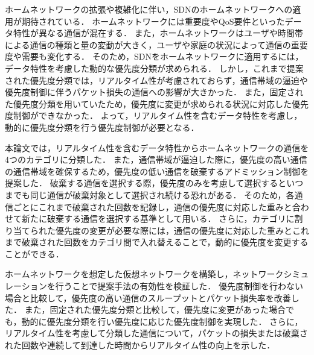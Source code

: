\documentclass[a4paper,11pt,uplatex]{ujreport}
\begin{document}
  ホームネットワークの拡張や複雑化に伴い，SDNのホームネットワークへの適用が期待されている．
  ホームネットワークには重要度やQoS要件といったデータ特性が異なる通信が混在する．
  また，ホームネットワークはユーザや時間帯による通信の種類と量の変動が大きく，ユーザや家庭の状況によって通信の重要度や需要も変化する．
  そのため，SDNをホームネットワークに適用するには，データ特性を考慮した動的な優先度分類が求められる．
  しかし，これまで提案された優先度分類では，リアルタイム性が考慮されておらず，通信帯域の逼迫や優先度制御に伴うパケット損失の通信への影響が大きかった．
  また，固定された優先度分類を用いていたため，優先度に変更が求められる状況に対応した優先度制御ができなかった．
  よって，リアルタイム性を含むデータ特性を考慮し，動的に優先度分類を行う優先度制御が必要となる．\par
  本論文では，リアルタイム性を含むデータ特性からホームネットワークの通信を4つのカテゴリに分類した．
  また，通信帯域が逼迫した際に，優先度の高い通信の通信帯域を確保するため，優先度の低い通信を破棄するアドミッション制御を提案した．
  破棄する通信を選択する際，優先度のみを考慮して選択するといつまでも同じ通信が破棄対象として選択され続ける恐れがある．
  そのため，各通信ごとにこれまで破棄された回数を記録し，通信の優先度に対応した重みと合わせて新たに破棄する通信を選択する基準として用いる．
  さらに，カテゴリに割り当てられた優先度の変更が必要な際には，通信の優先度に対応した重みとこれまで破棄された回数をカテゴリ間で入れ替えることで，動的に優先度を変更することができる．\par
  ホームネットワークを想定した仮想ネットワークを構築し，ネットワークシミュレーションを行うことで提案手法の有効性を検証した．
  優先度制御を行わない場合と比較して，優先度の高い通信のスループットとパケット損失率を改善した．
  また，固定された優先度分類と比較して，優先度に変更があった場合でも，動的に優先度分類を行い優先度に応じた優先度制御を実現した．
  さらに，リアルタイム性を考慮して分類した通信について，パケットの損失または破棄された回数や連続して到達した時間からリアルタイム性の向上を示した．

\end{document}

